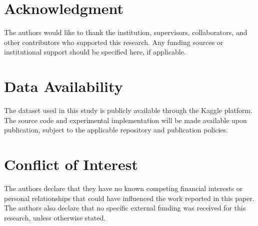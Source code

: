 \documentclass[journal]{IEEEtran}
\begin{document}
\section*{Acknowledgment}

The authors would like to thank the institution, supervisors, collaborators, and other contributors who supported this research. Any funding sources or institutional support should be specified here, if applicable.


\section*{Data Availability}

The dataset used in this study is publicly available through the Kaggle platform. The source code and experimental implementation will be made available upon publication, subject to the applicable repository and publication policies.


\section*{Conflict of Interest}

The authors declare that they have no known competing financial interests or personal relationships that could have influenced the work reported in this paper. The authors also declare that no specific external funding was received for this research, unless otherwise stated.
\end{document}
